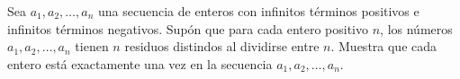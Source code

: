 Sea $a_1,a_2,\ldots,a_n$ una secuencia de enteros con infinitos términos positivos e infinitos términos negativos. Supón que para cada entero positivo $n$, los números $a_1,a_2,\ldots,a_n$ tienen $n$ residuos distindos al dividirse entre $n$. Muestra que cada entero está exactamente una vez en la secuencia $a_1,a_2,\ldots,a_n$.